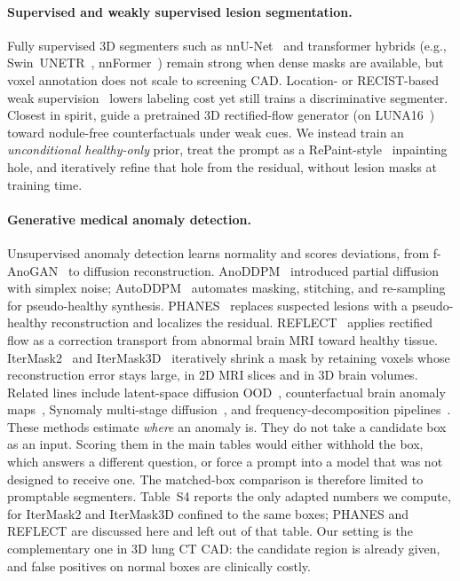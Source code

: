 \documentclass[twoside]{article}
\newcommand{\suppTabUnprompted}{Table~S4}
\begin{document}
\paragraph{Supervised and weakly supervised lesion segmentation.}
Fully supervised 3D segmenters such as nnU-Net~\citep{nnunet2021}
and transformer hybrids (e.g., Swin~UNETR~\citep{swinunetr2022},
nnFormer~\citep{nnformer2021}) remain strong when dense masks are
available, but voxel annotation does not scale to screening CAD.
Location- or RECIST-based weak supervision~\citep{deepem2018,zhou2023recist}
lowers labeling cost yet still trains a discriminative segmenter.
Closest in spirit, \citet{rectflow2026} guide a pretrained 3D
rectified-flow generator (on LUNA16~\citep{luna2017}) toward nodule-free
counterfactuals under weak cues.
We instead train an \emph{unconditional healthy-only} prior, treat the
prompt as a RePaint-style~\citep{lugmayr2022repaint} inpainting hole,
and iteratively refine that hole from the residual, without lesion
masks at training time.

\paragraph{Generative medical anomaly detection.}
Unsupervised anomaly detection learns normality and scores deviations,
from f-AnoGAN~\citep{fanogan2019} to diffusion reconstruction.
AnoDDPM~\citep{anoddpm2022} introduced partial diffusion with simplex
noise; AutoDDPM~\citep{autoddpm2023} automates masking, stitching, and
re-sampling for pseudo-healthy synthesis.
PHANES~\citep{phanes2023} replaces suspected lesions with a
pseudo-healthy reconstruction and localizes the residual.
REFLECT~\citep{reflect2025} applies rectified flow as a correction
transport from abnormal brain MRI toward healthy tissue.
IterMask2~\citep{itermask2024} and IterMask3D~\citep{itermask3d2025}
iteratively shrink a mask by retaining voxels whose reconstruction error
stays large, in 2D MRI slices and in 3D brain volumes.
Related lines include latent-space diffusion
OOD~\citep{latent_ad2023}, counterfactual brain anomaly
maps~\citep{fontanella2023},
Synomaly multi-stage diffusion~\citep{synomaly2024}, and
frequency-decomposition pipelines~\citep{fdp2026}.
These methods estimate \emph{where} an anomaly is.
They do not take a candidate box as an input.
Scoring them in the main tables would either withhold the box, which
answers a different question, or force a prompt into a model that was
not designed to receive one.
The matched-box comparison is therefore limited to promptable
segmenters.
\suppTabUnprompted{} reports the only adapted numbers we compute, for
IterMask2 and IterMask3D confined to the same boxes; PHANES and REFLECT
are discussed here and left out of that table.
Our setting is the complementary one in 3D lung CT CAD: the candidate
region is already given, and false positives on normal boxes are
clinically costly.
\end{document}
